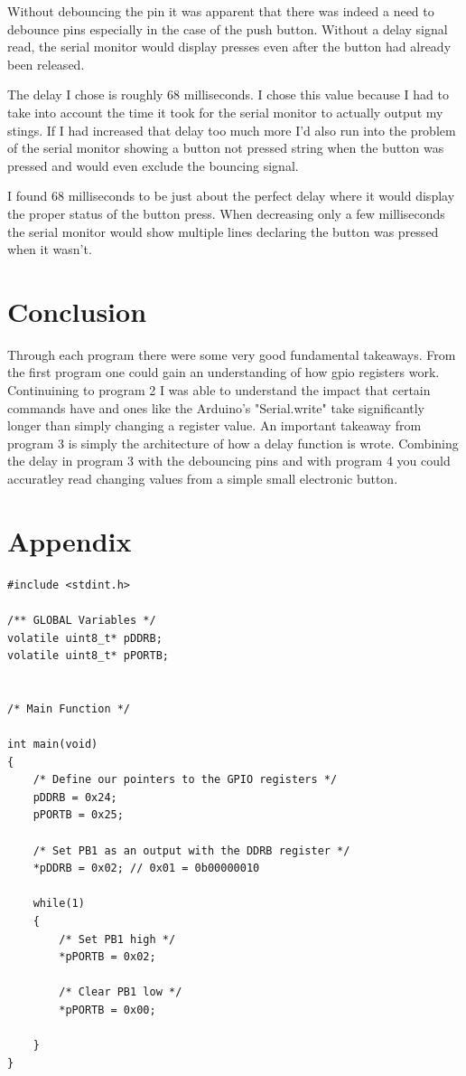 \documentclass[11pt,pdftex,portrait,letterpaper]{article}
\begin{document}
Without debouncing the pin it was apparent that there was indeed a need to debounce pins especially in the case of the push button. Without a delay signal read, the serial monitor would display presses even after the button had already been released. 

The delay I chose is roughly 68 milliseconds. I chose this value because I had to take into account the time it took for the serial monitor to actually output my stings. If I had increased that delay too much more I’d also run into the problem of the serial monitor showing a button not pressed string when the button was pressed and would even exclude the bouncing signal.

I found 68 milliseconds to be just about the perfect delay where it would display the proper status of the button press. When decreasing only a few milliseconds the serial monitor would show multiple lines declaring the button was pressed when it wasn’t. 


\section{Conclusion}

Through each program there were some very good fundamental takeaways. From the first program one could gain an understanding of how gpio registers work. Continuining to program 2 I was able to understand the impact that certain commands have and ones like the Arduino's "Serial.write" take significantly longer than simply changing a register value. An important takeaway from program 3 is simply the architecture of how a delay function is wrote. Combining the delay in program 3 with the debouncing pins and with program 4 you could accuratley read changing values from a simple small electronic button.

\pagebreak

\section{Appendix}

\begin{lstlisting}[caption={Program 1}, label=l:programx]
#include <stdint.h>

/** GLOBAL Variables */
volatile uint8_t* pDDRB;
volatile uint8_t* pPORTB;


/* Main Function */

int main(void)
{
	/* Define our pointers to the GPIO registers */
	pDDRB = 0x24;
	pPORTB = 0x25;
	
	/* Set PB1 as an output with the DDRB register */
	*pDDRB = 0x02; // 0x01 = 0b00000010
	
	while(1)
	{
		/* Set PB1 high */
		*pPORTB = 0x02;
		
		/* Clear PB1 low */
		*pPORTB = 0x00;
	
	}	
}

\end{lstlisting}
\end{document}
